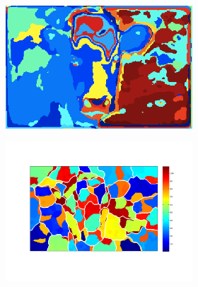 \documentclass{article} %
\begin{document}
\begin{figure}
\begin{subfigure}[c]{\textwidth}
\begin{subfigure}[c]{0.195\textwidth}
			\includegraphics[width = \textwidth]{./img/1_22_s_map.png}
			\label{fig:1_22_s_map}
		\end{subfigure}
		\begin{subfigure}[]{0.195\textwidth}
			\includegraphics[width = \textwidth]{./img/su1_22_s.pdf}
			\label{fig:1_22_s_su}
		\end{subfigure}
		\begin{subfigure}[c]{0.195\textwidth}

\end{subfigure}
\end{subfigure}
\end{figure}
\end{document}
